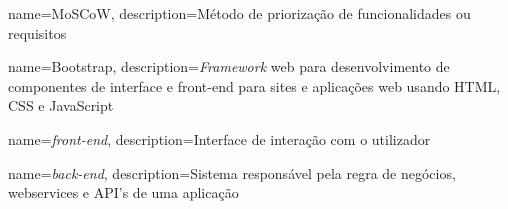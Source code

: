
{
   name=MoSCoW,
   description={Método de priorização de funcionalidades ou requisitos }
}

{
    name=Bootstrap,
    description={\textit{Framework} web para desenvolvimento de componentes de interface e front-end para sites e aplicações web usando HTML, CSS e JavaScript }
}


{
   name=\textit{front-end},
   description={Interface de interação com o utilizador }
}

{
   name=\textit{back-end},
   description={Sistema responsável pela regra de negócios, webservices e API's de uma aplicação}
}
